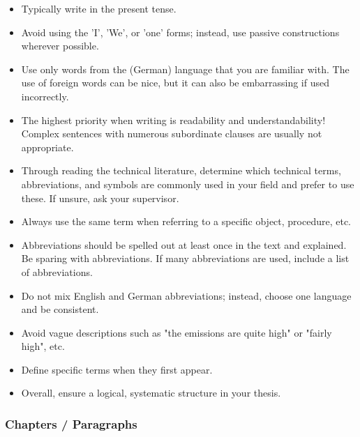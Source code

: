 \begin{itemize}
    \item Typically write in the present tense.
    \item Avoid using the 'I', 'We', or 'one' forms; instead, use passive constructions wherever possible.
    \item Use only words from the (German) language that you are familiar with. The use of foreign words can be nice, but it can also be embarrassing if used incorrectly.
    \item The highest priority when writing is readability and understandability! Complex sentences with numerous subordinate clauses are usually not appropriate.
    \item Through reading the technical literature, determine which technical terms, abbreviations, and symbols are commonly used in your field and prefer to use these. If unsure, ask your supervisor.
    \item Always use the same term when referring to a specific object, procedure, etc.
    \item Abbreviations should be spelled out at least once in the text and explained. Be sparing with abbreviations. If many abbreviations are used, include a list of abbreviations.
    \item Do not mix English and German abbreviations; instead, choose one language and be consistent.
    \item Avoid vague descriptions such as "the emissions are quite high" or "fairly high", etc.
    \item Define specific terms when they first appear.
    \item Overall, ensure a logical, systematic structure in your thesis.
\end{itemize}


\subsubsection{Chapters / Paragraphs}
\label{sec:chaptersParagraphs}


